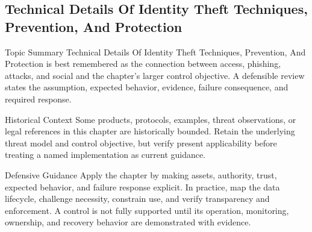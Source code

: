 \documentclass[11pt,letterpaper]{article}
\begin{document}
\subsection*{Technical Details Of Identity Theft Techniques, Prevention, And Protection}
\begin{CornellNotesTable}
\end{CornellNotesTable}
\begin{CornellSummaryBox}{Topic Summary}
Technical Details Of Identity Theft Techniques, Prevention, And Protection is best remembered as the connection between access, phishing, attacks, and social and the chapter's larger control objective. A defensible review states the assumption, expected behavior, evidence, failure consequence, and required response.
\end{CornellSummaryBox}
\begin{CornellWarningBox}{Historical Context}
Some products, protocols, examples, threat observations, or legal references in this chapter are historically bounded. Retain the underlying threat model and control objective, but verify present applicability before treating a named implementation as current guidance.
\end{CornellWarningBox}
\begin{CornellOverviewBox}{Defensive Guidance}
Apply the chapter by making assets, authority, trust, expected behavior, and failure response explicit. In practice, map the data lifecycle, challenge necessity, constrain use, and verify transparency and enforcement. A control is not fully supported until its operation, monitoring, ownership, and recovery behavior are demonstrated with evidence.
\end{CornellOverviewBox}
\end{document}
